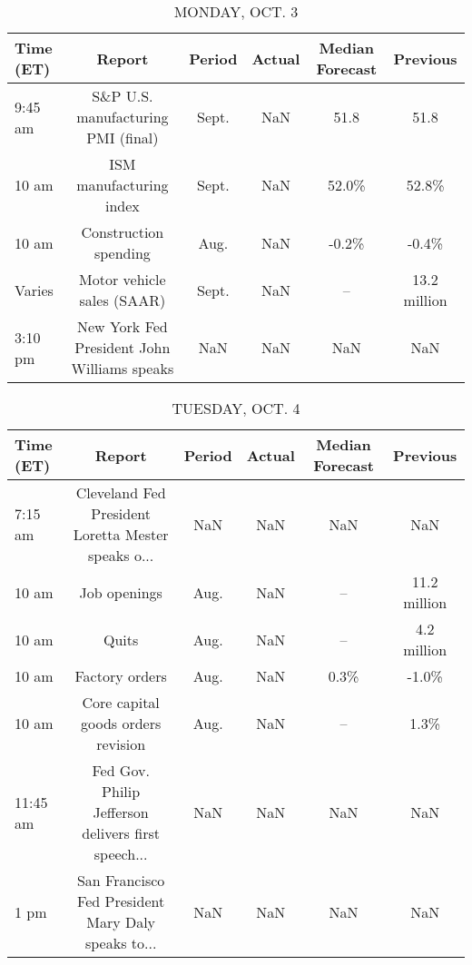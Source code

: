 \documentclass{article}%
\begin{document}
%
\normalsize%


\begin{table}[htbp]%
\caption{MONDAY, OCT. 3}%
\centering%
\begin{adjustbox}{width=1\textwidth}%
\begin{tabular}{lccccc}
\toprule
Time (ET) &                                      Report & Period & Actual & Median Forecast &     Previous \\
\midrule
  9:45 am &          S\&P U.S. manufacturing PMI (final) &  Sept. &    NaN &            51.8 &         51.8 \\
    10 am &                     ISM manufacturing index &  Sept. &    NaN &           52.0\% &        52.8\% \\
    10 am &                       Construction spending &   Aug. &    NaN &           -0.2\% &        -0.4\% \\
   Varies &                  Motor vehicle sales (SAAR) &  Sept. &    NaN &              -- & 13.2 million \\
  3:10 pm & New York Fed President John Williams speaks &    NaN &    NaN &             NaN &          NaN \\
\bottomrule
\end{tabular}
%
\end{adjustbox}%
\end{table}

%


\begin{table}[htbp]%
\caption{TUESDAY, OCT. 4}%
\centering%
\begin{adjustbox}{width=1\textwidth}%
\begin{tabular}{lccccc}
\toprule
Time (ET) &                                             Report & Period & Actual & Median Forecast &     Previous \\
\midrule
  7:15 am & Cleveland Fed President Loretta Mester speaks o... &    NaN &    NaN &             NaN &          NaN \\
    10 am &                                       Job openings &   Aug. &    NaN &              -- & 11.2 million \\
    10 am &                                              Quits &   Aug. &    NaN &              -- &  4.2 million \\
    10 am &                                     Factory orders &   Aug. &    NaN &            0.3\% &        -1.0\% \\
    10 am &                 Core capital goods orders revision &   Aug. &    NaN &              -- &         1.3\% \\
 11:45 am & Fed Gov. Philip Jefferson delivers first speech... &    NaN &    NaN &             NaN &          NaN \\
     1 pm & San Francisco Fed President Mary Daly speaks to... &    NaN &    NaN &             NaN &          NaN \\
\bottomrule
\end{tabular}
%
\end{adjustbox}%
\end{table}
\end{document}
